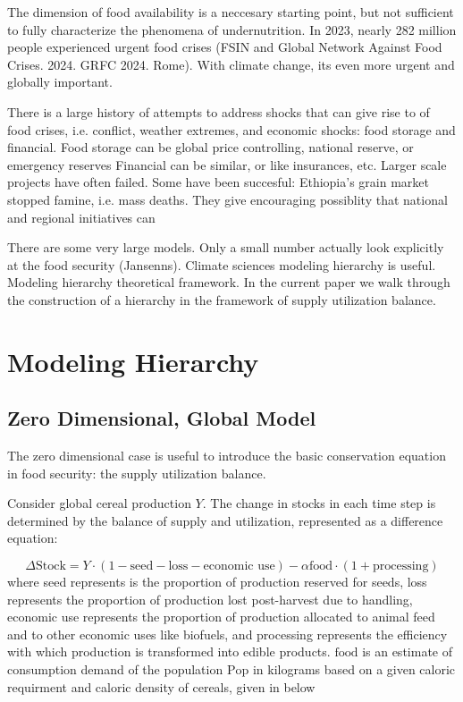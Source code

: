 \documentclass[11pt]{article}
\begin{document}
The dimension of food availability is a neccesary starting point, but not sufficient to fully characterize the phenomena of undernutrition.
In 2023, nearly 282 million people experienced urgent food crises (FSIN and Global Network Against Food Crises. 2024. GRFC 2024. Rome). With climate change, its even more urgent and globally important.

There is a large history of attempts to address shocks that can give rise to of food crises, i.e. conflict, weather extremes, and economic shocks: food storage and financial. 
Food storage can be global price controlling, national reserve, or emergency reserves
Financial can be similar, or like insurances, etc.
Larger scale projects have often failed.
Some have been succesful: Ethiopia's grain market stopped famine, i.e. mass deaths. They give encouraging possiblity that national and regional initiatives can  

There are some very large models. Only a small number actually look explicitly at the food security (Jansenns).
Climate sciences modeling hierarchy is useful. Modeling hierarchy theoretical framework. In the current paper we walk through the construction of a hierarchy in the framework of supply utilization balance.

\section{Modeling Hierarchy}
\subsection{Zero Dimensional, Global Model}

The zero dimensional case is useful to introduce the basic conservation equation in food security: the supply utilization balance. 

Consider global cereal production $Y$. The change in stocks in each time step is determined by the balance of supply and utilization, represented as a difference equation:

\begin{equation}
\Delta\text{Stock} = Y \cdot (1 - \text{seed} - \text{loss} - \text{economic use})  -  \alpha \text{food} \cdot (1 + \text{processing})
\end{equation}\label{eq:0d-deltastock}
where seed represents is the proportion of production reserved for seeds, loss represents the proportion of production lost post-harvest due to handling, economic use represents the proportion of production allocated to animal feed and to other economic uses like biofuels, and processing represents the efficiency with which production is transformed into edible products. $\text{food}$ is an estimate of consumption demand of the population $\text{Pop}$ in kilograms based on a given caloric requirment and caloric density of cereals, given in below %
\end{document}
